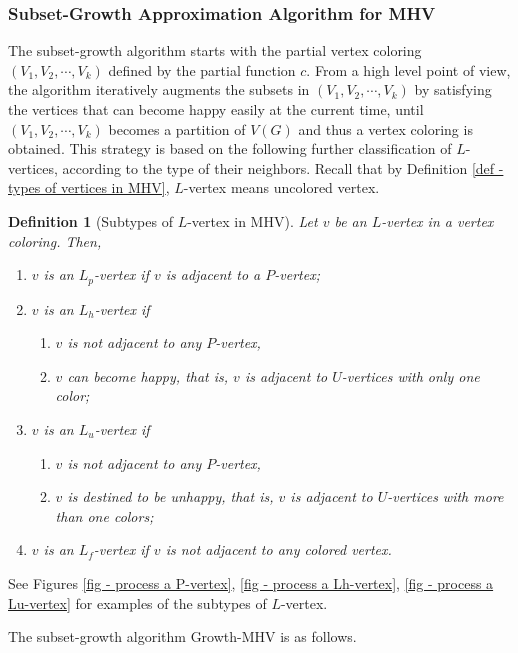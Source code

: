 \documentclass[11pt]{article}
\newtheorem{definition}{Definition}[section]
\begin{document}
\subsubsection{Subset-Growth Approximation Algorithm for MHV}
\label{subsec - subset-growth approxalg for MHV}
The subset-growth algorithm starts with the partial vertex coloring
$(V_1, V_2, \cdots, V_k)$ defined by the partial function $c$.
From a high level point of view, the algorithm iteratively augments
the subsets in $(V_1, V_2, \cdots, V_k)$ by satisfying the vertices that
can become happy easily at the current time, until $(V_1, V_2, \cdots, V_k)$
becomes a partition of $V(G)$ and thus a vertex coloring is obtained.
This strategy is based on the following further classification of
$L$-vertices, according to the type of their neighbors.
Recall that by Definition \ref{def - types of vertices in MHV},
$L$-vertex means uncolored vertex.

\begin{definition}[Subtypes of $L$-vertex in MHV]
Let $v$ be an $L$-vertex in a vertex coloring. Then,
\begin{enumerate}
\item $v$ is an {\em $L_p$-vertex} if $v$ is adjacent to a $P$-vertex;
\item $v$ is an {\em $L_{h}$-vertex} if
\begin{enumerate}
    \item $v$ is not adjacent to any $P$-vertex,
    \item $v$ can become happy, that is, $v$ is adjacent to $U$-vertices with only
    one color;
\end{enumerate}
\item $v$ is an {\em $L_{u}$-vertex} if
\begin{enumerate}
    \item $v$ is not adjacent to any $P$-vertex,
    \item $v$ is destined to be unhappy, that is, $v$ is adjacent to $U$-vertices
    with more than one colors;
\end{enumerate}
\item $v$ is an {\em $L_f$-vertex} if $v$ is not adjacent to any colored vertex.
\end{enumerate}
\end{definition}

See Figures \ref{fig - process a P-vertex}, \ref{fig - process a Lh-vertex},
\ref{fig - process a Lu-vertex} for examples of the subtypes of $L$-vertex.

The subset-growth algorithm {\sc Growth-MHV} is as follows.
\end{document}
